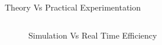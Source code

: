 \begin{frame}{Theory Vs Practical Experimentation}
\begin{columns}[t]
\begin{column}[T]{5cm}
\begin{figure}
        \vspace*{10pt}
        \captionsetup{justification=centering} %
        \caption{Simulation Vs Real Time Efficiency~\cite{wsn}}
      \end{figure}
    \end{column}
  \end{columns}
\end{frame}
